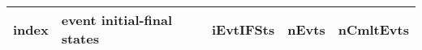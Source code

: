 \documentclass[landscape]{article}
\begin{document}
\clearpage

\begin{table}[htbp!]
\small
\centering
\begin{tabular}{|c|>{\centering}p{18cm}|c|c|c|}
\hline
index & event initial-final states & iEvtIFSts & nEvts & nCmltEvts \\
\hline
\end{tabular}
\end{table}
\end{document}
